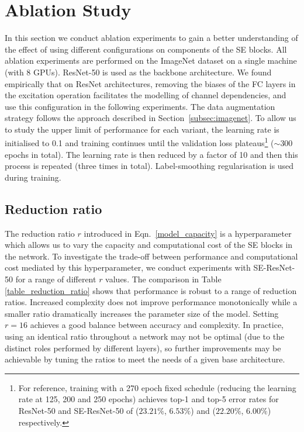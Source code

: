 \section{Ablation Study}\label{ablation_study}

In this section we conduct ablation experiments to gain a better understanding of the effect of using different configurations on components of the SE blocks.  All ablation experiments are performed on the ImageNet dataset on a single machine (with 8 GPUs). \mbox{ResNet-50} is used as the backbone architecture. We found empirically that on ResNet architectures, removing the biases of the FC layers in the excitation operation facilitates the modelling of channel dependencies, and use this configuration in the following experiments.
The data augmentation strategy follows the approach described in Section~\ref{subsec:imagenet}.  
To allow us to study the upper limit of performance for each variant, the learning rate is initialised to 0.1 and training continues until the validation loss plateaus\footnote{For reference, training with a 270 epoch fixed schedule (reducing the learning rate at 125, 200 and 250 epochs) achieves \mbox{top-1} and \mbox{top-5} error rates for \mbox{ResNet-50} and \mbox{SE-ResNet-50} of ($23.21\%$, $6.53\%$) and ($22.20\%$, $6.00\%$) respectively.} (${\sim}300$ epochs in total). The learning rate is then reduced by a factor of 10 and then this process is repeated (three times in total).  Label-smoothing regularisation  \cite{szegedy_cvpr2016inceptionv3} is used during training.



\subsection{Reduction ratio}\label{subsec:reduction} The reduction ratio $r$ introduced in Eqn.~\ref{model_capacity} is a hyperparameter which allows us to vary the capacity and computational cost of the SE blocks in the network. To investigate the trade-off between performance and computational cost mediated by this hyperparameter, we conduct experiments with \mbox{SE-ResNet-50} for a range of different $r$ values. The comparison in Table \ref{table_reduction_ratio} shows that performance is robust to a range of reduction ratios. Increased complexity does not improve performance monotonically while a smaller ratio dramatically increases the parameter size of the model.  
Setting $r = 16$ achieves a good balance between accuracy and complexity. In practice, using an identical ratio throughout a network may not be optimal (due to the distinct roles performed by different layers), so further improvements may be achievable by tuning the ratios to meet the needs of a given base architecture.

